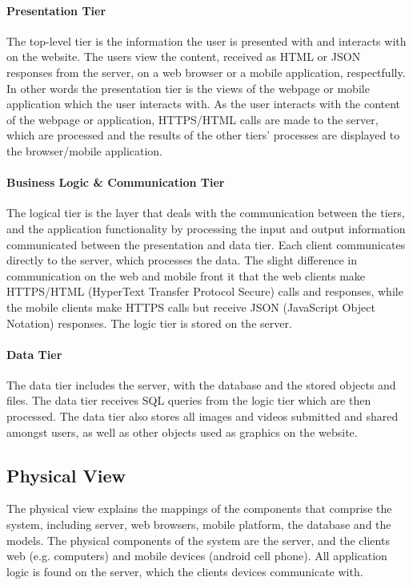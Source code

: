 \paragraph{Presentation Tier}
The top-level tier is the information the user is presented with and interacts with on the website. The users view the content, received as HTML or JSON responses from the server, on a web browser or a mobile application, respectfully.  In other words the presentation tier is the views of the webpage or mobile application which the user interacts with. As the user interacts with the content of the webpage or application, HTTPS/HTML calls are made to the server, which are processed and the results of the other tiers' processes are displayed to the browser/mobile application. 

\paragraph{Business Logic \& Communication Tier}
The logical tier is the layer that deals with the communication between the tiers, and the application functionality by processing the input and output information communicated between the presentation and data tier. Each client communicates directly to the server, which processes the data. The slight difference in communication on the web and mobile front it that the web clients make HTTPS/HTML (HyperText Transfer Protocol Secure) calls and responses, while the mobile clients make HTTPS calls but receive JSON (JavaScript Object Notation) responses. The logic tier is stored on the server. 

\paragraph{Data Tier}
The data tier includes the server, with the database and the stored objects and files. The data tier receives SQL queries from the logic tier which are then processed. The data tier also stores all images and videos submitted and shared amongst users, as well as other objects used as graphics on the website. 

\newpage
\subsection{Physical View}
The physical view explains the mappings of the components that comprise the system, including server, web browsers, mobile platform, the database and the models. The physical components of the system are the server, and the clients web (e.g. computers) and mobile devices (android cell phone). All application logic is found on the server, which the clients devices communicate with. 

